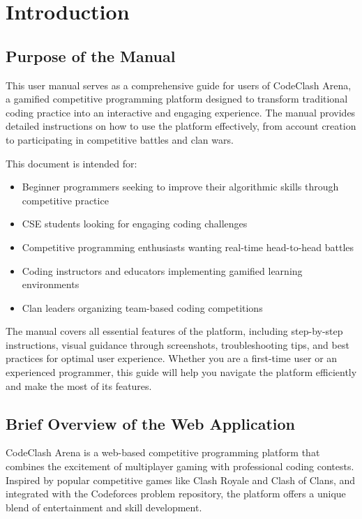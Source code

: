 \documentclass[12pt]{article}
\begin{document}
\pagestyle{empty}
\tableofcontents
\clearpage
\pagestyle{plain}
\setcounter{page}{1}

\section{Introduction}

\subsection{Purpose of the Manual}

This user manual serves as a comprehensive guide for users of CodeClash Arena, a gamified competitive programming platform designed to transform traditional coding practice into an interactive and engaging experience. The manual provides detailed instructions on how to use the platform effectively, from account creation to participating in competitive battles and clan wars.

This document is intended for:
\begin{itemize}
\item Beginner programmers seeking to improve their algorithmic skills through competitive practice
\item CSE students looking for engaging coding challenges
\item Competitive programming enthusiasts wanting real-time head-to-head battles
\item Coding instructors and educators implementing gamified learning environments
\item Clan leaders organizing team-based coding competitions
\end{itemize}

The manual covers all essential features of the platform, including step-by-step instructions, visual guidance through screenshots, troubleshooting tips, and best practices for optimal user experience. Whether you are a first-time user or an experienced programmer, this guide will help you navigate the platform efficiently and make the most of its features.

\subsection{Brief Overview of the Web Application}

CodeClash Arena is a web-based competitive programming platform that combines the excitement of multiplayer gaming with professional coding contests. Inspired by popular competitive games like Clash Royale and Clash of Clans, and integrated with the Codeforces problem repository, the platform offers a unique blend of entertainment and skill development.
\end{document}
